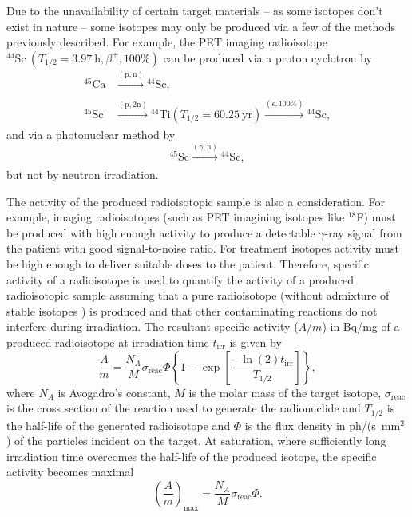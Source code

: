 \documentclass[../main.tex]{subfiles}
\begin{document}
Due to the unavailability of certain target materials -- as some isotopes don't exist in nature -- some isotopes may only be produced via a few of the methods previously described. For example, the PET imaging radioisotope $^{44}\mathrm{Sc}~\left(T_{1/2}=3.97~\si{\hour}, \beta^{+}, 100\%\right)$\cite{roesch2012scandium,muller2014promising} can be produced via a proton cyclotron by 
\begin{align}
^{45}\mathrm{Ca}&\xrightarrow[]{\left(\mathrm{p},\mathrm{n}\right)}{}^{44}\mathrm{Sc},
\label{eq:44Sc_direct} \\
^{45}\mathrm{Sc}&\xrightarrow[]{\left(\mathrm{p},2\mathrm{n}\right)}{}^{44}\mathrm{Ti}\left(T_{1/2}=60.25~\mathrm{yr}\right)\xrightarrow[]{\left(\epsilon, 100\%\right)}{}^{44}\mathrm{Sc},
\label{eq:44Sc_generator}
\end{align}
and via a photonuclear method by
\begin{equation}
^{45}\mathrm{Sc}\xrightarrow[]{\left(\gamma,\mathrm{n}\right)}{}^{44}\mathrm{Sc},
\label{eq:44Sc_photonuclear}   
\end{equation}
but not by neutron irradiation.

The activity of the produced radioisotopic sample is also a consideration. For example, imaging radioisotopes (such as PET imagining isotopes like $^{18}$F) must be produced with high enough activity to produce a detectable $\gamma$-ray signal from the patient with good signal-to-noise ratio. For treatment isotopes activity must be high enough to deliver suitable doses to the patient. Therefore, specific activity of a radioisotope is used to quantify the activity of a produced radioisotopic sample assuming that a pure radioisotope (without admixture of stable isotopes \cite{habs2011production}) is produced and that other contaminating reactions do not interfere during irradiation. The resultant specific activity ($A/m$) in \si{\becquerel}/\si{\milli\gram} of a produced radioisotope at irradiation time $t_{\mathrm{irr}}$ is given by \cite{habs2011production}
\begin{equation}
\frac{A}{m} = \frac{N_{A}}{M}\sigma_{\mathrm{reac}}\Phi\left\{1-\exp\left[\frac{-\ln\left(2\right)t_{\mathrm{irr}}}{T_{1/2}}\right]\right\},
\label{eq:specific_activity}    
\end{equation}
where $N_{A}$ is Avogadro's constant, $M$ is the molar mass of the target isotope, $\sigma_{\mathrm{reac}}$ is the cross section of the reaction used to generate the radionuclide and $T_{1/2}$ is the half-life of the generated radioisotope and $\Phi$ is the flux density in ph/(\si{\second}~$\mathrm{\si{\milli\meter}}^2$) of the particles incident on the target. At saturation, where sufficiently long irradiation time overcomes the half-life of the produced isotope, the specific activity becomes maximal
\begin{equation}
\left(\frac{A}{m}\right)_{\mathrm{max}} = \frac{N_{A}}{M}\sigma_{\mathrm{reac}}\Phi.
\label{eq:sat_specific_activity}    
\end{equation}
\end{document}
